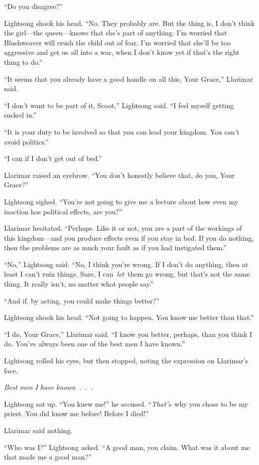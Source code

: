 “Do you disagree?”

Lightsong shook his head. “No. They probably are. But the thing is, I don’t think the girl—the queen—knows that she’s part of anything. I’m worried that Blushweaver will crush the child out of fear. I’m worried that she’ll be too aggressive and get us all into a war, when I don’t know yet if that’s the right thing to do.”

“It seems that you already have a good handle on all this, Your Grace,” Llarimar said.

“I don’t want to be part of it, Scoot,” Lightsong said. “I feel myself getting sucked in.”

“It is your duty to be involved so that you can lead your kingdom. You can’t avoid politics.”

“I can if I don’t get out of bed.”

Llarimar raised an eyebrow. “You don’t honestly believe that, do you, Your Grace?”

Lightsong sighed. “You’re not going to give me a lecture about how even my inaction has political effects, are you?”

Llarimar hesitated. “Perhaps. Like it or not, you are a part of the workings of this kingdom—and you produce effects even if you stay in bed. If you do nothing, then the problems are as much your fault as if you had instigated them.”

“No,” Lightsong said. “No, I think you’re wrong. If I don’t do anything, then at least I can’t ruin things. Sure, I can~\textit{let}~them go wrong, but that’s not the same thing. It really isn’t, no matter what people say.”

“And if, by acting, you could make things better?”

Lightsong shook his head. “Not going to happen. You know me better than that.”

“I do, Your Grace,” Llarimar said. “I know you better, perhaps, than you think I do. You’ve always been one of the best men I have known.”

Lightsong rolled his eyes, but then stopped, noting the expression on Llarimar’s face.

\textit{Best men I have known~.~.~.}

Lightsong sat up. “You knew me!” he accused. “\textit{That’s}~why you chose to be my priest. You did know me before! Before I died!”

Llarimar said nothing.

“Who was I?” Lightsong asked. “A good man, you claim. What was it about me that made me a good man?”

